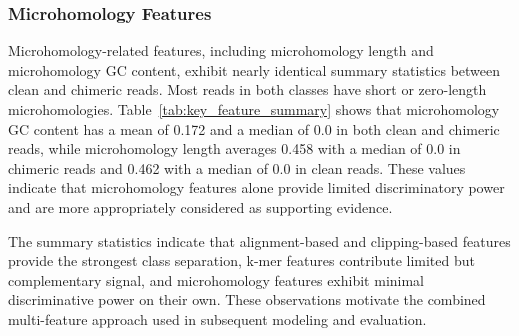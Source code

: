 \subsubsection{Microhomology Features}

Microhomology-related features, including microhomology length and microhomology GC content, exhibit nearly identical summary statistics between clean and chimeric reads. Most reads in both classes have short or zero-length microhomologies. Table~\ref{tab:key_feature_summary} shows that microhomology GC content has a mean of 0.172 and a median of 0.0 in both clean and chimeric reads, while microhomology length averages 0.458 with a median of 0.0 in chimeric reads and 0.462 with a median of 0.0 in clean reads. These values indicate that microhomology features alone provide limited discriminatory power and are more appropriately considered as supporting evidence.

The summary statistics indicate that alignment-based and clipping-based features provide the strongest class separation, k-mer features contribute limited but complementary signal, and microhomology features exhibit minimal discriminative power on their own. These observations motivate the combined multi-feature approach used in subsequent modeling and evaluation.

